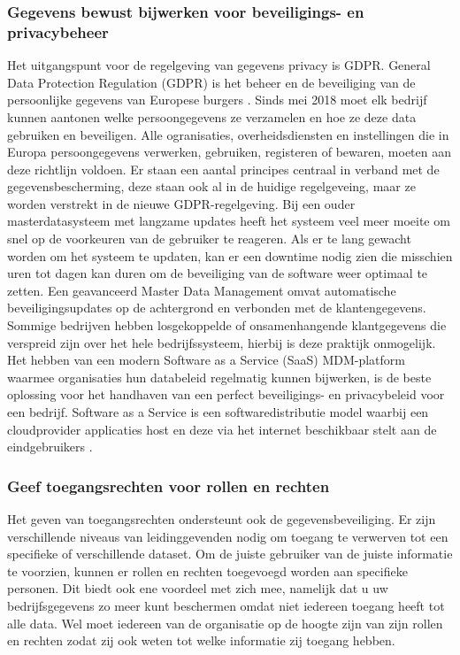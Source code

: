 \subsubsection{Gegevens bewust bijwerken voor beveiligings- en privacybeheer}
Het uitgangspunt voor de regelgeving van gegevens privacy is GDPR.
General Data Protection Regulation (GDPR) is het beheer en de beveiliging van de persoonlijke gegevens van Europese burgers \autocite{Vlaanderen}. Sinds mei 2018 moet elk bedrijf kunnen aantonen welke persoongegevens ze verzamelen en hoe ze deze data gebruiken en beveiligen. Alle ogranisaties, overheidsdiensten en instellingen die in Europa persoongegevens verwerken, gebruiken, registeren of bewaren, moeten aan deze richtlijn voldoen. Er staan een aantal principes centraal in verband met de gegevensbescherming, deze staan ook al in de huidige regelgeveing, maar ze worden verstrekt in de nieuwe GDPR-regelgeving.
Bij een ouder masterdatasysteem met langzame updates heeft het systeem veel meer moeite om snel op de voorkeuren van de gebruiker te reageren. Als er te lang gewacht worden om het systeem te updaten, kan er een downtime nodig zien die misschien uren tot dagen kan duren om de beveiliging van de software weer optimaal te zetten. Een geavanceerd Master Data Management omvat automatische beveiligingsupdates op de achtergrond en verbonden met de klantengegevens. Sommige bedrijven hebben losgekoppelde of onsamenhangende klantgegevens die verspreid zijn over het hele bedrijfssysteem, hierbij is deze praktijk onmogelijk. Het hebben van een modern Software as a Service (SaaS) MDM-platform waarmee organisaties hun databeleid regelmatig kunnen bijwerken, is de beste oplossing voor het handhaven van een perfect beveiligings- en privacybeleid voor een bedrijf. Software as a Service is een softwaredistributie model waarbij een cloudprovider applicaties host en deze via het internet beschikbaar stelt aan de eindgebruikers \autocite{Chai2022}.

\subsubsection{Geef toegangsrechten voor rollen en rechten}
Het geven van toegangsrechten ondersteunt ook de gegevensbeveiliging. Er zijn verschillende niveaus van leidinggevenden nodig om toegang te verwerven tot een specifieke of verschillende dataset. Om de juiste gebruiker van de juiste informatie te voorzien, kunnen er rollen en rechten toegevoegd worden aan specifieke personen. Dit biedt ook ene voordeel met zich mee, namelijk dat u uw bedrijfsgegevens zo meer kunt beschermen omdat niet iedereen toegang heeft tot alle data. Wel moet iedereen van de organisatie op de hoogte zijn van zijn rollen en rechten zodat zij ook weten tot welke informatie zij toegang hebben. 


